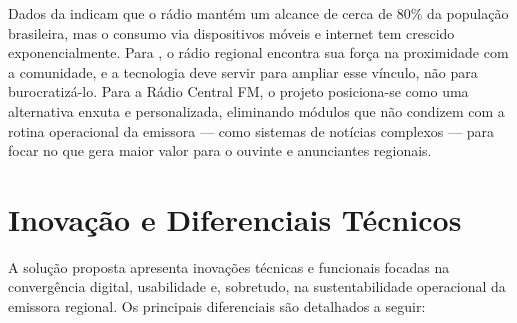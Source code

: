 \documentclass[12pt, openright, oneside, a4paper, brazil]{ads-unipac-abntex2}
\begin{document}
Dados da  indicam que o rádio mantém um alcance de cerca de 80\% da população brasileira, mas o consumo via dispositivos móveis e internet tem crescido exponencialmente. Para , o rádio regional encontra sua força na proximidade com a comunidade, e a tecnologia deve servir para ampliar esse vínculo, não para burocratizá-lo. Para a Rádio Central FM, o projeto posiciona-se como uma alternativa enxuta e personalizada, eliminando módulos que não condizem com a rotina operacional da emissora — como sistemas de notícias complexos — para focar no que gera maior valor para o ouvinte e anunciantes regionais.

\section{Inovação e Diferenciais Técnicos}
A solução proposta apresenta inovações técnicas e funcionais focadas na convergência digital, usabilidade e, sobretudo, na sustentabilidade operacional da emissora regional. Os principais diferenciais são detalhados a seguir:
\end{document}
